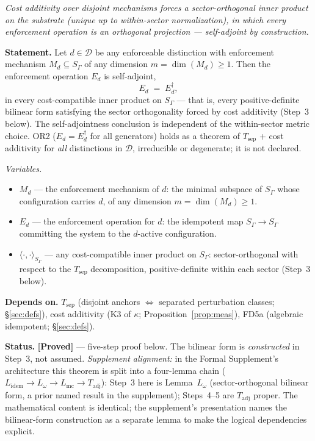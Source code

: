 \documentclass[11pt]{article}
\theoremstyle{remark}
\newenvironment{varlist}{\begin{itemize}[nosep,leftmargin=2em]}{\end{itemize}}
\begin{document}
\begin{tcolorbox}[apfbox, title={Theorem $T_{\mathrm{adj}}$ --- Bridge Step 1: $*$-Involution from Cost Symmetry}]
\textit{Cost additivity over disjoint mechanisms forces a sector-orthogonal inner product on the substrate (unique up to within-sector normalization), in which every enforcement operation is an orthogonal projection --- self-adjoint by construction.}

\smallskip\noindent\textbf{Statement.}  Let $d \in \mathcal{D}$ be any enforceable distinction with enforcement mechanism $M_d \subseteq S_\Gamma$ of any dimension $m = \dim(M_d) \ge 1$.  Then the enforcement operation $E_d$ is self-adjoint,
\[
E_d \;=\; E_d^\dagger,
\]
in every cost-compatible inner product on $S_\Gamma$ --- that is, every positive-definite bilinear form satisfying the sector orthogonality forced by cost additivity (Step~3 below).  The self-adjointness conclusion is independent of the within-sector metric choice.  OR2 ($E_d = E_d^\dagger$ for all generators) holds as a theorem of $T_{\mathrm{sep}}$ + cost additivity for \emph{all} distinctions in $\mathcal{D}$, irreducible or degenerate; it is not declared.

\smallskip\noindent\textit{Variables.}
\begin{varlist}
\item $M_d$ --- the enforcement mechanism of $d$: the minimal subspace of $S_\Gamma$ whose configuration carries $d$, of any dimension $m = \dim(M_d) \ge 1$.
\item $E_d$ --- the enforcement operation for $d$: the idempotent map $S_\Gamma \to S_\Gamma$ committing the system to the $d$-active configuration.
\item $\langle \cdot, \cdot \rangle_{S_\Gamma}$ --- any cost-compatible inner product on $S_\Gamma$: sector-orthogonal with respect to the $T_{\mathrm{sep}}$ decomposition, positive-definite within each sector (Step~3 below).
\end{varlist}

\smallskip\noindent\textbf{Depends on.}  $T_{\mathrm{sep}}$ (disjoint anchors $\Leftrightarrow$ separated perturbation classes; \S\ref{sec:defs}), cost additivity (K3 of $\kappa$; Proposition~\ref{prop:meas}), FD5a (algebraic idempotent; \S\ref{sec:defs}).

\smallskip\noindent\textbf{Status.}  \textbf{[Proved]} --- five-step proof below.  The bilinear form is \emph{constructed} in Step~3, not assumed.  \textit{Supplement alignment:} in the Formal Supplement's architecture this theorem is split into a four-lemma chain ($L_{\mathrm{idem}} \to L_\omega \to L_{\mathrm{mc}} \to T_{\mathrm{adj}}$): Step~3 here is Lemma~$L_\omega$ (sector-orthogonal bilinear form, a prior named result in the supplement); Steps~4--5 are $T_{\mathrm{adj}}$ proper.  The mathematical content is identical; the supplement's presentation names the bilinear-form construction as a separate lemma to make the logical dependencies explicit.


\end{tcolorbox}
\end{document}
